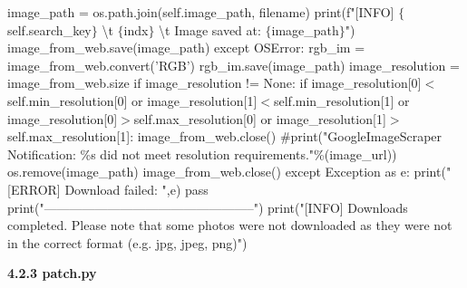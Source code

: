 \documentclass[10pt]{article} %
\begin{document}
\begin{spacing}{1.5}
image\_path = os.path.join(self.image\_path, filename)                      \newline
print(f"[INFO] $\mathrm{\{}$self.search\_key$\mathrm{\}}$ {\textbackslash}t $\mathrm{\{}$indx$\mathrm{\}}$ {\textbackslash}t Image saved at: $\mathrm{\{}$image\_path$\mathrm{\}}$")    \newline                        image\_from\_web.save(image\_path)  \newline
except OSError:     \newline
rgb\_im = image\_from\_web.convert('RGB')   \newline
rgb\_im.save(image\_path)   \newline
image\_resolution = image\_from\_web.size   \newline
if image\_resolution != None:   \newline
if image\_resolution[0]$\mathrm{<}$self.min\_resolution[0] or\newline
image\_resolution[1]$\mathrm{<}$self.min\_resolution[1] or\newline
image\_resolution[0]$\mathrm{>}$self.max\_resolution[0] or\newline
image\_resolution[1]$\mathrm{>}$self.max\_resolution[1]:\newline
image\_from\_web.close()\newline
\#print("GoogleImageScraper Notification: \%s did not meet resolution requirements."\%(image\_url))                              \newline
os.remove(image\_path)  \newline
image\_from\_web.close()    \newline
except Exception as e:  \newline
print("[ERROR] Download failed: ",e)    \newline
pass    \newline
print("--------------------------------------------------") \newline
print("[INFO] Downloads completed. Please note that some photos were not downloaded as they were not in the correct format (e.g. jpg, jpeg, png)")\newline


\noindent 

\noindent \textbf{}

\noindent \textbf{4.2.3 patch.py}

\noindent \textbf{}


\end{spacing}
\end{document}

